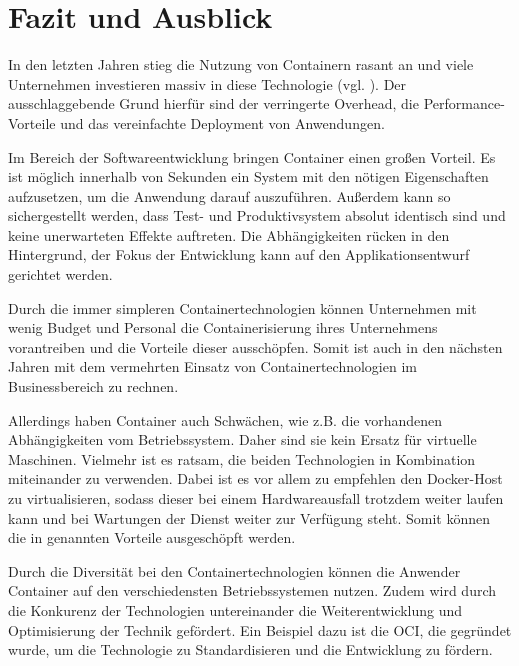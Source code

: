 \section{Fazit und Ausblick} 
\label{sec:Fazit}
In den letzten Jahren stieg die Nutzung von Containern rasant an und viele Unternehmen investieren massiv in diese Technologie (vgl. ).
Der ausschlaggebende Grund hierfür sind der verringerte Overhead, die Performance-Vorteile und das vereinfachte Deployment von Anwendungen.

Im Bereich der Softwareentwicklung bringen Container einen großen Vorteil. Es ist möglich innerhalb von Sekunden ein System mit den nötigen Eigenschaften aufzusetzen, um die Anwendung darauf auszuführen.
Außerdem kann so sichergestellt werden, dass Test- und Produktivsystem absolut identisch sind und keine unerwarteten Effekte auftreten.
Die Abhängigkeiten rücken in den Hintergrund, der Fokus der Entwicklung kann auf den Applikationsentwurf gerichtet werden.

Durch die immer simpleren Containertechnologien können Unternehmen mit wenig Budget und Personal die Containerisierung ihres Unternehmens vorantreiben und die Vorteile dieser ausschöpfen. Somit ist auch in den nächsten Jahren mit dem vermehrten Einsatz von Containertechnologien im Businessbereich zu rechnen.

Allerdings haben Container auch Schwächen, wie z.B. die vorhandenen Abhängigkeiten vom Betriebssystem.
Daher sind sie kein Ersatz für virtuelle Maschinen. Vielmehr ist es ratsam, die beiden Technologien in Kombination miteinander zu verwenden. Dabei ist es vor allem zu empfehlen den Docker-Host zu virtualisieren, sodass dieser bei einem Hardwareausfall trotzdem weiter laufen kann und bei Wartungen der Dienst weiter zur Verfügung steht. Somit können die in  genannten Vorteile ausgeschöpft werden.

Durch die Diversität bei den Containertechnologien können die Anwender Container auf den verschiedensten Betriebssystemen nutzen.
Zudem wird durch die Konkurenz der Technologien untereinander die Weiterentwicklung und Optimisierung der Technik gefördert.
Ein Beispiel dazu ist die \ac{OCI}, die gegründet wurde, um die Technologie zu Standardisieren und die Entwicklung zu fördern.